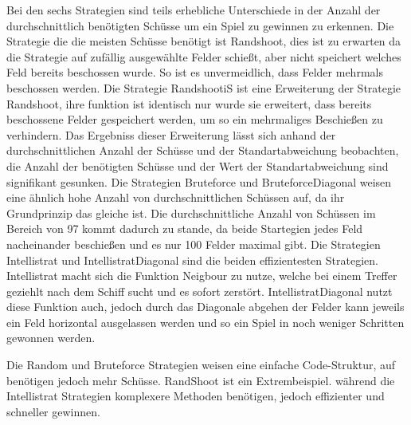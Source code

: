Bei den sechs Strategien sind teils erhebliche Unterschiede in der Anzahl der durchschnittlich benötigten Schüsse um ein Spiel zu gewinnen zu erkennen. Die Strategie die die meisten 
Schüsse benötigt ist Randshoot, dies ist zu erwarten da die Strategie auf zufällig ausgewählte Felder schießt, aber nicht speichert welches Feld bereits beschossen wurde. So ist es  unvermeidlich, dass Felder mehrmals beschossen werden. Die Strategie RandshootiS ist eine Erweiterung der Strategie Randshoot, ihre funktion ist identisch nur wurde sie 
erweitert, dass bereits beschossene Felder gespeichert werden, um so ein mehrmaliges Beschießen zu verhindern. Das Ergebniss dieser Erweiterung lässt sich anhand der durchschnittlichen 
Anzahl der Schüsse und der Standartabweichung beobachten, die Anzahl der benötigten Schüsse und der Wert der Standartabweichung sind signifikant gesunken. Die Strategien Bruteforce 
und BruteforceDiagonal weisen eine ähnlich hohe Anzahl von durchschnittlichen Schüssen auf, da ihr Grundprinzip das gleiche ist. Die durchschnittliche Anzahl von Schüssen im Bereich 
von 97 kommt dadurch zu stande, da beide Startegien jedes Feld nacheinander beschießen und es nur 100 Felder maximal gibt. Die Strategien Intellistrat und IntellistratDiagonal sind 
die beiden effizientesten Strategien. Intellistrat macht sich die Funktion Neigbour zu nutze, welche bei einem Treffer geziehlt nach dem Schiff sucht und es sofort zerstört. 
IntellistratDiagonal nutzt diese Funktion auch, jedoch durch das Diagonale abgehen der Felder kann jeweils ein Feld horizontal ausgelassen werden und so ein Spiel in noch weniger 
Schritten gewonnen werden.

Die Random und Bruteforce Strategien weisen eine einfache Code-Struktur, auf benötigen jedoch mehr Schüsse. RandShoot ist ein Extrembeispiel. während die Intellistrat Strategien 
komplexere Methoden benötigen, jedoch effizienter und schneller gewinnen.